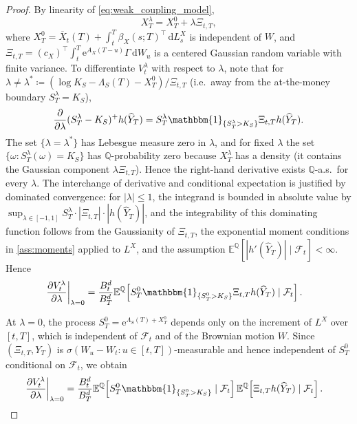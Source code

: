 \documentclass[10pt,reqno]{amsart}
\newcommand{\E}{\mathbb{E}}
\newcommand{\Q}{\mathbb{Q}}
\newcommand{\F}{\mathcal{F}}
\newcommand{\1}{\mathbbm{1}}
\newcommand{\dd}{\mathrm{d}}
\newcommand{\ee}{\mathrm{e}}
\begin{document}
\begin{proof}
By linearity of \eqref{eq:weak_coupling_model},
$$
X_T^\lambda = X_T^0 + \lambda \Xi_{t,T},
$$
where $X_T^0 = \overline{X}_t(T) + \int_t^T \beta_X(s;T)^\top\,\dd
L_s^X$ is independent of $W$, and $\Xi_{t,T} = (c_X)^\top\int_t^T
\ee^{A_X(T-u)}\Gamma\,\dd W_u$ is a centered Gaussian random variable with
finite variance. To differentiate $V_t^\lambda$ with respect to
$\lambda$, note that for $\lambda \neq \lambda^* \coloneqq
(\log K_S - \Lambda_S(T) - X_T^0)/\Xi_{t,T}$ (i.e.\ away from the
at-the-money boundary $S_T^\lambda = K_S$),
$$
\frac{\partial}{\partial\lambda}(S_T^\lambda - K_S)^+ h(\widehat{Y}_T)
= S_T^\lambda \1_{\{S_T^\lambda>K_S\}} \Xi_{t,T} h(\widehat{Y}_T).
$$
The set $\{\lambda = \lambda^*\}$ has Lebesgue measure zero in $\lambda$,
and for fixed $\lambda$ the set $\{\omega: S_T^\lambda(\omega) = K_S\}$
has $\Q$-probability zero because $X_T^\lambda$ has a density
(it contains the Gaussian component $\lambda\Xi_{t,T}$). Hence the
right-hand derivative exists $\Q$-a.s.\ for every $\lambda$.
The interchange of derivative and conditional expectation is justified by
dominated convergence: for $|\lambda| \le 1$, the integrand is bounded in
absolute value by
$\sup_{\lambda\in[-1,1]}S_T^\lambda\cdot|\Xi_{t,T}|\cdot|h(\widehat{Y}_T)|$, and the
integrability of this dominating function follows from the Gaussianity of
$\Xi_{t,T}$, the exponential moment conditions in
\ref{ass:moments} applied to $L^X$, and the
assumption $\E^\Q[|h'(\widehat{Y}_T)|\mid\F_t]<\infty$.
Hence
\begin{align*}
  \left.\frac{\partial V_t^\lambda}{\partial \lambda}\right|_{\lambda=0}
  &= \frac{B_t^d}{B_T^d}
     \E^\Q\!\left[
       S_T^0 \1_{\{S_T^0>K_S\}} \Xi_{t,T} h(\widehat{Y}_T)
       \mid \F_t
     \right].
\end{align*}

At $\lambda=0$, the process $S_T^0 = \ee^{\Lambda_S(T)+X_T^0}$ depends
only on the increment of $L^X$ over $[t,T]$, which is independent of
$\F_t$ and of the Brownian motion $W$. Since $(\Xi_{t,T},Y_T)$ is
$\sigma(W_u-W_t : u \in [t,T])$-measurable and hence independent of
$S_T^0$ conditional on $\F_t$, we obtain
\begin{align*}
  \left.\frac{\partial V_t^\lambda}{\partial \lambda}\right|_{\lambda=0}
  &= \frac{B_t^d}{B_T^d}
     \E^\Q\!\left[S_T^0 \1_{\{S_T^0>K_S\}}\mid\F_t\right]
     \E^\Q\!\left[\Xi_{t,T} h(\widehat{Y}_T)\mid\F_t\right].
\end{align*}


\end{proof}
\end{document}
